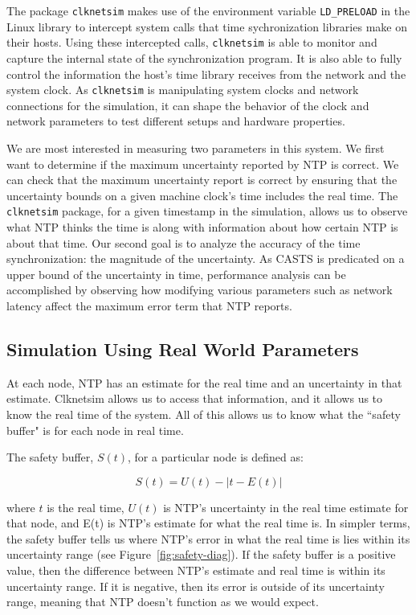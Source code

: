 The package \texttt{clknetsim} makes use of the environment variable
\texttt{LD\_PRELOAD} in the Linux library to intercept system calls
that time sychronization libraries make on their hosts. Using these
intercepted calls, \texttt{clknetsim} is able to monitor and capture
the internal state of the synchronization program. It is also able to
fully control the information the host's time library receives from
the network and the system clock. As \texttt{clknetsim} is
manipulating system clocks and network connections for the simulation,
it can shape the behavior of the clock and network parameters to test
different setups and hardware properties.

We are most interested in measuring two parameters in this system. We
first want to determine if the maximum uncertainty reported by NTP is
correct. We can check that the maximum uncertainty report is correct
by ensuring that the uncertainty bounds on a given machine clock's
time includes the real time.  The \texttt{clknetsim} package, for a
given timestamp in the simulation, allows us to observe what NTP
thinks the time is along with information about how certain NTP is
about that time. Our second goal is to analyze the accuracy of the
time synchronization: the magnitude of the uncertainty.  As 
CASTS is predicated on a upper bound of the uncertainty in time,
performance analysis can be accomplished by observing how modifying
various parameters such as network latency affect the maximum error
term that NTP reports.

\subsection{Simulation Using Real World Parameters}

At each node, NTP has an estimate for the real time and an uncertainty
in that estimate. Clknetsim allows us to access that information, and
it allows us to know the real time of the system. All of this allows
us to know what the ``safety buffer" is for each node in real time.

The safety buffer, $S(t)$,  for a particular node is defined as:

\[ S(t) = U(t) - | t - E(t)| \]

where $t$ is the real time, $U(t)$ is NTP's uncertainty in the real
time estimate for that node, and E(t) is NTP's estimate for what the
real time is. In simpler terms, the safety buffer tells us where NTP's
error in what the real time is lies within its uncertainty range (see
Figure~\ref{fig:safety-diag}). If the safety buffer is a positive
value, then the difference between NTP's estimate and real time is
within its uncertainty range. If it is negative, then its error is
outside of its uncertainty range, meaning that NTP doesn't function as
we would expect.

